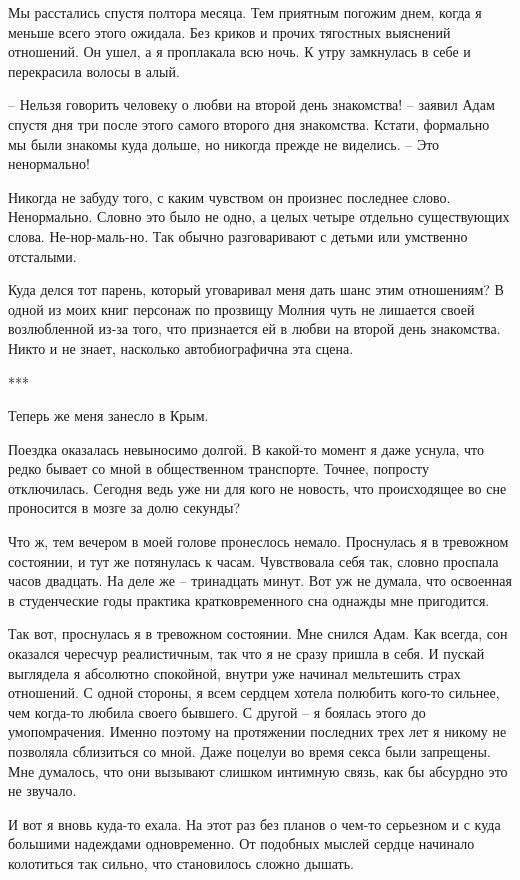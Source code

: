 \documentclass[
]{book}
\begin{document}
Мы расстались спустя полтора месяца. Тем приятным погожим днем, когда я меньше всего этого ожидала. Без криков и прочих тягостных выяснений отношений. Он ушел, а я проплакала всю ночь. К утру замкнулась в себе и перекрасила волосы в алый.

-- Нельзя говорить человеку о любви на второй день знакомства! -- заявил Адам спустя дня три после этого самого второго дня знакомства. Кстати, формально мы были знакомы куда дольше, но никогда прежде не виделись. -- Это ненормально!

Никогда не забуду того, с каким чувством он произнес последнее слово. Ненормально. Словно это было не одно, а целых четыре отдельно существующих слова. Не-нор-маль-но. Так обычно разговаривают с детьми или умственно отсталыми.

Куда делся тот парень, который уговаривал меня дать шанс этим отношениям? В одной из моих книг персонаж по прозвищу Молния чуть не лишается своей возлюбленной из-за того, что признается ей в любви на второй день знакомства. Никто и не знает, насколько автобиографична эта сцена.

***

Теперь же меня занесло в Крым.

Поездка оказалась невыносимо долгой. В какой-то момент я даже уснула, что редко бывает со мной в общественном транспорте. Точнее, попросту отключилась. Сегодня ведь уже ни для кого не новость, что происходящее во сне проносится в мозге за долю секунды?

Что ж, тем вечером в моей голове пронеслось немало. Проснулась я в тревожном состоянии, и тут же потянулась к часам. Чувствовала себя так, словно проспала часов двадцать. На деле же -- тринадцать минут. Вот уж не думала, что освоенная в студенческие годы практика кратковременного сна однажды мне пригодится.

Так вот, проснулась я в тревожном состоянии. Мне снился Адам. Как всегда, сон оказался чересчур реалистичным, так что я не сразу пришла в себя. И пускай выглядела я абсолютно спокойной, внутри уже начинал мельтешить страх отношений. С одной стороны, я всем сердцем хотела полюбить кого-то сильнее, чем когда-то любила своего бывшего. С другой -- я боялась этого до умопомрачения. Именно поэтому на протяжении последних трех лет я никому не позволяла сблизиться со мной. Даже поцелуи во время секса были запрещены. Мне думалось, что они вызывают слишком интимную связь, как бы абсурдно это не звучало.

И вот я вновь куда-то ехала. На этот раз без планов о чем-то серьезном и с куда большими надеждами одновременно. От подобных мыслей сердце начинало колотиться так сильно, что становилось сложно дышать.
\end{document}
